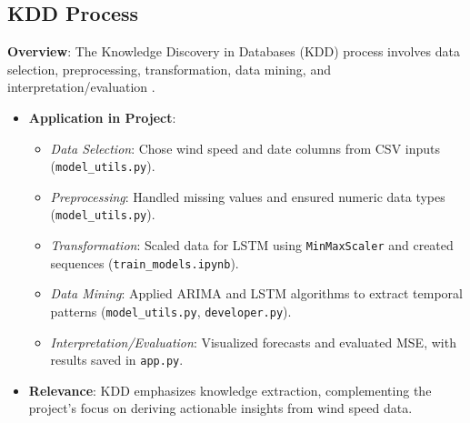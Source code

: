 \subsection{KDD Process}
\textbf{Overview}: The Knowledge Discovery in Databases (KDD) process involves data selection, preprocessing, transformation, data mining, and interpretation/evaluation \cite{FayyadEtAl1996}.
\begin{itemize}
	\item \textbf{Application in Project}: 
	\begin{itemize}
		\item \textit{Data Selection}: Chose wind speed and date columns from CSV inputs (\texttt{model\_utils.py}).
		\item \textit{Preprocessing}: Handled missing values and ensured numeric data types (\texttt{model\_utils.py}).
		\item \textit{Transformation}: Scaled data for LSTM using \texttt{MinMaxScaler} and created sequences (\texttt{train\_models.ipynb}).
		\item \textit{Data Mining}: Applied ARIMA and LSTM algorithms to extract temporal patterns (\texttt{model\_utils.py}, \texttt{developer.py}).
		\item \textit{Interpretation/Evaluation}: Visualized forecasts and evaluated MSE, with results saved in \texttt{app.py}.
	\end{itemize}
	\item \textbf{Relevance}: KDD emphasizes knowledge extraction, complementing the project's focus on deriving actionable insights from wind speed data.
\end{itemize}
